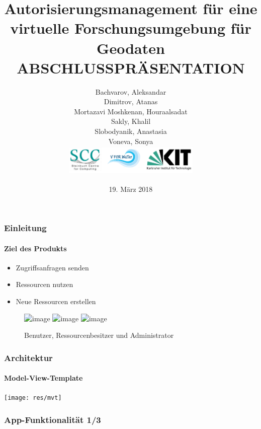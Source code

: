 \documentclass{beamer}
\title[Autorisierungsmanagement für eine virtuelle
Forschungsumgebung für Geodaten: Abschlusspräsentation]{Autorisierungsmanagement für eine virtuelle
Forschungsumgebung für Geodaten \\ \textbf{ABSCHLUSSPRÄSENTATION}} %
\author[]{
Bachvarov, Aleksandar\\
Dimitrov, Atanas\\
Mortazavi Moshkenan, Houraalsadat\\
Sakly, Khalil\\
Slobodyanik, Anastasia\\
Voneva, Sonya\\ \vspace{.75cm}
	\includegraphics[width=6.5cm, height=1.5cm]{res/logos} 
}
\date{19. März 2018} %
\begin{document}
\begin{frame}[plain]
\titlepage %
\end{frame}




\begin{frame}
\frametitle{Einleitung}
\framesubtitle{Ziel des Produkts}

\begin{itemize}
	\item<1-7> Zugriffsanfragen senden
	\item<2-7> Ressourcen nutzen
	\item<3-7> Neue Ressourcen erstellen
\end{itemize}
	\begin{figure}
		
			\includegraphics<4-7>[height=2cm,width=2cm]{res/benutzer}
			\hspace{0.2cm}
			\includegraphics<5-7>[height=2cm,width=2cm]{res/ressbesitzer}
			\hspace{0.2cm}
			\includegraphics<6-7>[height=2cm,width=2cm]{res/admin}	
			\item<7>Benutzer, Ressourcenbesitzer und Administrator
			
	\end{figure}

\end{frame}
\begin{frame}

\frametitle{Architektur}
\framesubtitle{Model-View-Template}
\vspace{1cm}
\texttt{[image: res/mvt]}

\end{frame}
\begin{frame}
\frametitle{App-Funktionalität 1/3}
\begin{center}

\end{center}\end{frame}
\end{document}
